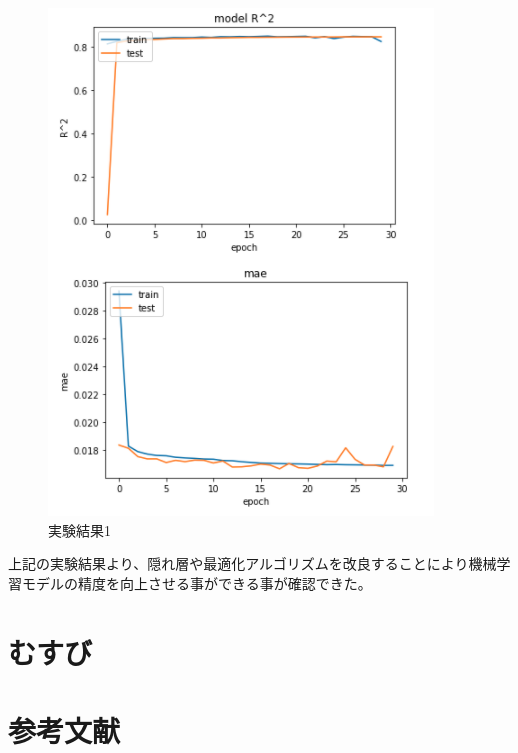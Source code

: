 \documentclass{article}
\begin{document}
\begin{figure}[H]
\begin{center}
\includegraphics[width=\linewidth]{experiment2.png}
\caption{実験結果1}
\end{center}
\end{figure}


上記の実験結果より、隠れ層や最適化アルゴリズムを改良することにより機械学習モデルの精度を向上させる事ができる事が確認できた。

\newpage
\section{むすび}

\newpage
\section{参考文献}




 \citep{adams1995hitchhiker}



\end{document}
